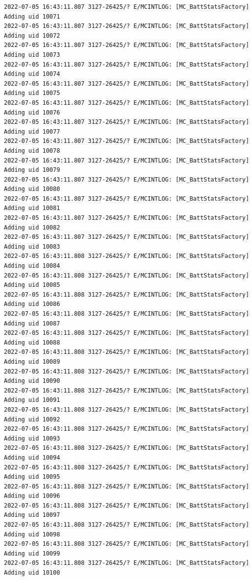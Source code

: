 \documentclass[a4paper,12pt]{book}
\begin{document}
\begin{lstlisting}
2022-07-05 16:43:11.807 3127-26425/? E/MCINTLOG: [MC_BattStatsFactory] Adding uid 10071
2022-07-05 16:43:11.807 3127-26425/? E/MCINTLOG: [MC_BattStatsFactory] Adding uid 10072
2022-07-05 16:43:11.807 3127-26425/? E/MCINTLOG: [MC_BattStatsFactory] Adding uid 10073
2022-07-05 16:43:11.807 3127-26425/? E/MCINTLOG: [MC_BattStatsFactory] Adding uid 10074
2022-07-05 16:43:11.807 3127-26425/? E/MCINTLOG: [MC_BattStatsFactory] Adding uid 10075
2022-07-05 16:43:11.807 3127-26425/? E/MCINTLOG: [MC_BattStatsFactory] Adding uid 10076
2022-07-05 16:43:11.807 3127-26425/? E/MCINTLOG: [MC_BattStatsFactory] Adding uid 10077
2022-07-05 16:43:11.807 3127-26425/? E/MCINTLOG: [MC_BattStatsFactory] Adding uid 10078
2022-07-05 16:43:11.807 3127-26425/? E/MCINTLOG: [MC_BattStatsFactory] Adding uid 10079
2022-07-05 16:43:11.807 3127-26425/? E/MCINTLOG: [MC_BattStatsFactory] Adding uid 10080
2022-07-05 16:43:11.807 3127-26425/? E/MCINTLOG: [MC_BattStatsFactory] Adding uid 10081
2022-07-05 16:43:11.807 3127-26425/? E/MCINTLOG: [MC_BattStatsFactory] Adding uid 10082
2022-07-05 16:43:11.807 3127-26425/? E/MCINTLOG: [MC_BattStatsFactory] Adding uid 10083
2022-07-05 16:43:11.808 3127-26425/? E/MCINTLOG: [MC_BattStatsFactory] Adding uid 10084
2022-07-05 16:43:11.808 3127-26425/? E/MCINTLOG: [MC_BattStatsFactory] Adding uid 10085
2022-07-05 16:43:11.808 3127-26425/? E/MCINTLOG: [MC_BattStatsFactory] Adding uid 10086
2022-07-05 16:43:11.808 3127-26425/? E/MCINTLOG: [MC_BattStatsFactory] Adding uid 10087
2022-07-05 16:43:11.808 3127-26425/? E/MCINTLOG: [MC_BattStatsFactory] Adding uid 10088
2022-07-05 16:43:11.808 3127-26425/? E/MCINTLOG: [MC_BattStatsFactory] Adding uid 10089
2022-07-05 16:43:11.808 3127-26425/? E/MCINTLOG: [MC_BattStatsFactory] Adding uid 10090
2022-07-05 16:43:11.808 3127-26425/? E/MCINTLOG: [MC_BattStatsFactory] Adding uid 10091
2022-07-05 16:43:11.808 3127-26425/? E/MCINTLOG: [MC_BattStatsFactory] Adding uid 10092
2022-07-05 16:43:11.808 3127-26425/? E/MCINTLOG: [MC_BattStatsFactory] Adding uid 10093
2022-07-05 16:43:11.808 3127-26425/? E/MCINTLOG: [MC_BattStatsFactory] Adding uid 10094
2022-07-05 16:43:11.808 3127-26425/? E/MCINTLOG: [MC_BattStatsFactory] Adding uid 10095
2022-07-05 16:43:11.808 3127-26425/? E/MCINTLOG: [MC_BattStatsFactory] Adding uid 10096
2022-07-05 16:43:11.808 3127-26425/? E/MCINTLOG: [MC_BattStatsFactory] Adding uid 10097
2022-07-05 16:43:11.808 3127-26425/? E/MCINTLOG: [MC_BattStatsFactory] Adding uid 10098
2022-07-05 16:43:11.808 3127-26425/? E/MCINTLOG: [MC_BattStatsFactory] Adding uid 10099
2022-07-05 16:43:11.808 3127-26425/? E/MCINTLOG: [MC_BattStatsFactory] Adding uid 10100

\end{lstlisting}
\end{document}
